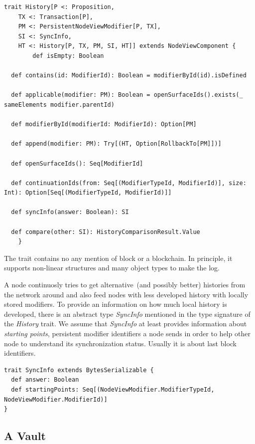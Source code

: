 \documentclass[]{report}   %
\begin{document}
\begin{lstlisting}
trait History[P <: Proposition,
	TX <: Transaction[P],
	PM <: PersistentNodeViewModifier[P, TX],
	SI <: SyncInfo,
	HT <: History[P, TX, PM, SI, HT]] extends NodeViewComponent {
		def isEmpty: Boolean

  def contains(id: ModifierId): Boolean = modifierById(id).isDefined

  def applicable(modifier: PM): Boolean = openSurfaceIds().exists(_ sameElements modifier.parentId)

  def modifierById(modifierId: ModifierId): Option[PM]

  def append(modifier: PM): Try[(HT, Option[RollbackTo[PM]])]

  def openSurfaceIds(): Seq[ModifierId]

  def continuationIds(from: Seq[(ModifierTypeId, ModifierId)], size: Int): Option[Seq[(ModifierTypeId, ModifierId)]]

  def syncInfo(answer: Boolean): SI

  def compare(other: SI): HistoryComparisonResult.Value	
	}
\end{lstlisting}

The trait contains no any mention of block or a blockchain. In principle, it supports non-linear structures and many object types to make the log. 

A node continuosly tries to get alternative~(and possibly better) histories from the network around and also feed nodes with less developed history with locally stored modifiers. To provide an information on how much local history is developed, there is an abstract type \textit{SyncInfo} mentioned in the type signature of the \textit{History} trait. We assume that \textit{SyncInfo} at least provides information about \textit{starting points}, persistent modifier identifiers a node sends in order to help other node to understand its synchronization status. Usually it is about last block identifiers. 

\begin{lstlisting}
trait SyncInfo extends BytesSerializable {
  def answer: Boolean
  def startingPoints: Seq[(NodeViewModifier.ModifierTypeId, NodeViewModifier.ModifierId)]
}
\end{lstlisting}



\subsection{A Vault}
\end{document}

